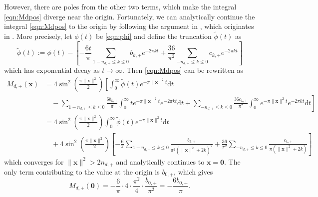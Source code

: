 \documentclass[10pt,reqno]{amsproc}
\newcommand{\dd}{\mathrm{d}}
\newcommand{\bx}{\mathbf{x}}
\newcommand{\1}{\mathds{1}}	%
\theoremstyle{definition}
\theoremstyle{remark}
\begin{document}
However, there are poles from the other two terms, which make the integral \eqref{eqn:Mdpos} diverge near the origin.
Fortunately, we can analytically continue the integral \eqref{eqn:Mdpos} to the origin by following the argument in \cite[Proposition 2.1]{feigenbaum2021eigenfunctions}, which originates in \cite{viazovska2017sphere,cohn2017sphere}.
More precisely, let $\phi(t)$ be \eqref{eqn:phi} and define the truncation $\widetilde{\phi}(t)$ as
\begin{equation}
    \label{eqn:phitilde}
    \widetilde{\phi}(t) := \phi(t) - \left[-\frac{6t}{\pi} \sum_{1-n_{d,+} \le k \le 0} b_{k,+} e^{-2 \pi k t} + \frac{36}{\pi^2} \sum_{-n_{d,+} \le k \le 0} c_{k,+} e^{-2 \pi k t}\right]
\end{equation}
which has exponential decay as $t \to \infty$.
Then \eqref{eqn:Mdpos} can be rewritten as
\begin{align*}
    M_{d,+}(\bx) &= 4 \sin^{2} \left(\frac{\pi \|\mathbf{x}\|^{2}}{2}\right) \left[\int_{0}^{\infty} \widetilde{\phi}(t) e^{-\pi \|\mathbf{x}\|^{2} t} \dd t \right.
    \\
    &\left.\quad - \sum_{1-n_{d,+} \le k \le 0} \frac{6 b_{k,+}}{\pi} \int_{0}^{\infty} t e^{-\pi \|\mathbf{x}\|^{2} t} e^{-2 \pi k t} \dd t + \sum_{-n_{d,+} \le k \le 0} \frac{36 c_{k,+}}{\pi^2} \int_{0}^{\infty} e^{-\pi \|\mathbf{x}\|^{2} t} e^{-2 \pi k t} \dd t \right] \\
    &= 4 \sin^2\left(\frac{\pi \|\bx\|^2}{2}\right)\int_0^{\infty} \widetilde{\phi}(t) e^{-\pi \|\bx\|^2 t} \dd t \\
    &\quad + 4 \sin^2\left(\frac{\pi \|\bx\|^2}{2}\right) \left[ - \frac{6}{\pi}\sum_{1-n_{d,+} \le k \le 0} \frac{b_{k,+}}{\pi^2 (\|\bx\|^2 + 2k)^2} + \frac{36}{\pi^2} \sum_{-n_{d,+} \le k \le 0} \frac{c_{k,+}}{\pi (\|\bx\|^2 + 2 k)}\right]
\end{align*}
which converges for $\|\bx\|^2 > 2n_{d,+}$ and analytically continues to $\bx = \mathbf{0}$.
The only term contributing to the value at the origin is $b_{0,+}$, which gives
\begin{equation}
    \label{eqn:Mpos_orig}
    M_{d,+}(\mathbf{0}) = -\frac{6}{\pi} \cdot 4 \cdot \frac{\pi^2}{4} \cdot \frac{b_{0,+}}{\pi^2} = - \frac{6 b_{0,+}}{\pi}.
\end{equation}
\end{document}

